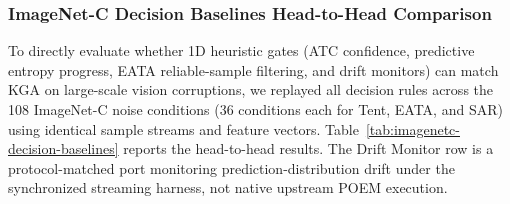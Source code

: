 \subsubsection{ImageNet-C Decision Baselines Head-to-Head Comparison}
\label{app:imagenetc-decision-baselines}

To directly evaluate whether 1D heuristic gates (ATC confidence, predictive entropy progress, EATA reliable-sample filtering,
and drift monitors) can match KGA on large-scale vision corruptions, we replayed all decision rules across the 108
ImageNet-C noise conditions (36 conditions each for Tent, EATA, and SAR) using identical sample streams and feature vectors.
Table~\ref{tab:imagenetc-decision-baselines} reports the head-to-head results. The Drift Monitor row is a protocol-matched
port monitoring prediction-distribution drift under the synchronized streaming harness, not native upstream POEM execution.

